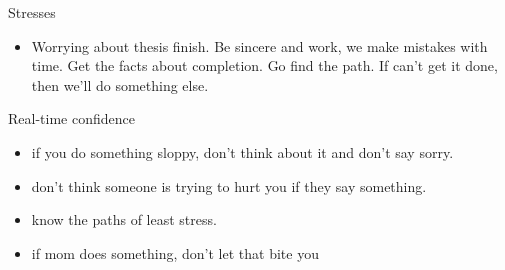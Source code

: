 \documentclass[serif, mathserif, final]{beamer}
\begin{document}
\begin{frame}{} 
  \begin{columns}
\begin{column}{0.25\linewidth} %
  \begin{block}{Stresses}
    \begin{itemize} 
    \item \tiny Worrying about thesis finish. Be sincere and work, we
      make mistakes with time. Get the facts about completion.  Go
      find the path. If can't get it done, then we'll do something
      else.
    \end{itemize} 
  \end{block} 

  \begin{block}{Real-time confidence}
    \begin{itemize} 
      \tiny \item \tiny if you do something sloppy, don't think about it and don't say sorry. 
    \item \tiny don't think someone is trying to hurt you if they say something.       
    \item \tiny know the paths of least stress. 
    \item \tiny if mom does something, don't let that bite you 
    \end{itemize} 
  \end{block} 


\end{column}
\end{columns}
\end{frame}
\end{document}
